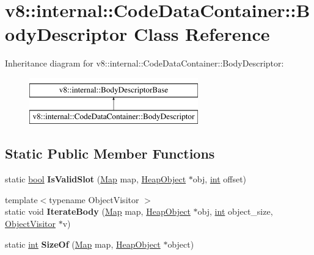 \hypertarget{classv8_1_1internal_1_1CodeDataContainer_1_1BodyDescriptor}{}\section{v8\+:\+:internal\+:\+:Code\+Data\+Container\+:\+:Body\+Descriptor Class Reference}
\label{classv8_1_1internal_1_1CodeDataContainer_1_1BodyDescriptor}
Inheritance diagram for v8\+:\+:internal\+:\+:Code\+Data\+Container\+:\+:Body\+Descriptor\+:\begin{figure}[H]
\begin{center}
\leavevmode
\includegraphics[height=2.000000cm]{classv8_1_1internal_1_1CodeDataContainer_1_1BodyDescriptor}
\end{center}
\end{figure}
\subsection*{Static Public Member Functions}
\begin{DoxyCompactItemize}
\item 
\mbox{\label{classv8_1_1internal_1_1CodeDataContainer_1_1BodyDescriptor_a19c1cf96cf4450deb18e4050226697f7}} 
static \mbox{\hyperlink{classbool}{bool}} {\bfseries Is\+Valid\+Slot} (\mbox{\hyperlink{classv8_1_1internal_1_1Map}{Map}} map, \mbox{\hyperlink{classv8_1_1internal_1_1HeapObject}{Heap\+Object}} $\ast$obj, \mbox{\hyperlink{classint}{int}} offset)
\item 
\mbox{\label{classv8_1_1internal_1_1CodeDataContainer_1_1BodyDescriptor_a12ba8b03ad5762c1f825c476f210b4e1}} 
{\footnotesize template$<$typename Object\+Visitor $>$ }\\static void {\bfseries Iterate\+Body} (\mbox{\hyperlink{classv8_1_1internal_1_1Map}{Map}} map, \mbox{\hyperlink{classv8_1_1internal_1_1HeapObject}{Heap\+Object}} $\ast$obj, \mbox{\hyperlink{classint}{int}} object\+\_\+size, \mbox{\hyperlink{classv8_1_1internal_1_1ObjectVisitor}{Object\+Visitor}} $\ast$v)
\item 
\mbox{\label{classv8_1_1internal_1_1CodeDataContainer_1_1BodyDescriptor_a35f743a57b42ddd95ef5d15ecc2074d7}} 
static \mbox{\hyperlink{classint}{int}} {\bfseries Size\+Of} (\mbox{\hyperlink{classv8_1_1internal_1_1Map}{Map}} map, \mbox{\hyperlink{classv8_1_1internal_1_1HeapObject}{Heap\+Object}} $\ast$object)
\end{DoxyCompactItemize}
